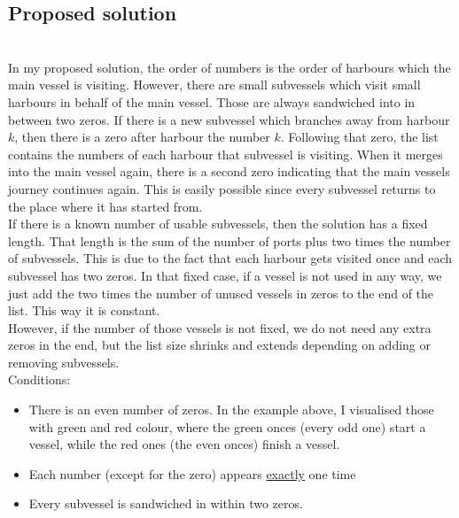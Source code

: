 \documentclass[a4paper,10pt]{article}
\theoremstyle{mytheor}
\begin{document}
\subsection*{Proposed solution}
\\
In my proposed solution, the order of numbers is the order of harbours which the main vessel is visiting. However, there are small subvessels which visit small harbours in behalf of the main vessel. Those are always sandwiched into in between two zeros. If there is a new subvessel which branches away from harbour $k$, then there is a zero after harbour the number $k$. Following that zero, the list contains the numbers of each harbour that subvessel is visiting. When it merges into the main vessel again, there is a second zero indicating that the main vessels journey continues again. This is easily possible since every subvessel returns to the place where it has started from.\\
If there is a known number of usable subvessels, then the solution has a fixed length. That length is the sum of the number of ports plus two times the number of subvessels. This is due to the fact that each harbour gets visited once and each subvessel has two zeros. In that fixed case, if a vessel is not used in any way, we just add the two times the number of unused vessels in zeros to the end of the list. This way it is constant.\\
However, if the number of those vessels is not fixed, we do not need any extra zeros in the end, but the list size shrinks and extends depending on adding or removing subvessels.\\
Conditions:
\begin{itemize}
\item There is an even number of zeros. In the example above, I visualised those with green and red colour, where the green onces (every odd one) start a vessel, while the red ones (the even onces) finish a vessel.
\item Each number (except for the zero) appears \underline{exactly} one time
\item Every subvessel is sandwiched in within two zeros.
\end{itemize}
\end{document}
